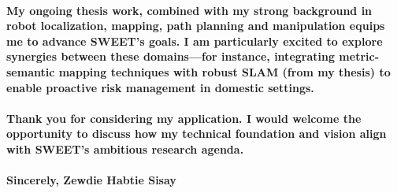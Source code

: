 \paragraph{\textnormal{
My ongoing thesis work, combined with my strong background in robot localization, mapping, path planning and manipulation equips me to advance SWEET’s goals. I am particularly excited to explore synergies between these domains—for instance, integrating metric-semantic mapping techniques with robust SLAM (from my thesis) to enable proactive risk management in domestic settings. \\\\
Thank you for considering my application. I would welcome the opportunity to discuss how my technical foundation and vision align with SWEET’s ambitious research agenda.	
	}}
\paragraph{\textnormal{
Sincerely,
Zewdie Habtie Sisay
}}
